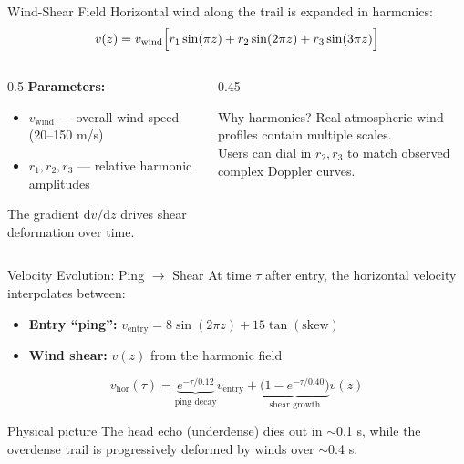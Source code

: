 \documentclass[aspectratio=169,11pt]{beamer}
\begin{document}
\begin{frame}{Wind-Shear Field}
Horizontal wind along the trail is expanded in harmonics:
\[
v(z) = v_{\mathrm{wind}} \Bigl[ r_1 \sin(\pi z) + r_2 \sin(2\pi z) + r_3 \sin(3\pi z) \Bigr]
\]

\begin{columns}
\begin{column}{0.5\textwidth}
\textbf{Parameters:}
\begin{itemize}
    \item $v_{\mathrm{wind}}$ --- overall wind speed (20--150 m/s)
    \item $r_1, r_2, r_3$ --- relative harmonic amplitudes
\end{itemize}
\vspace{0.3em}
The gradient $\mathrm{d}v/\mathrm{d}z$ drives shear deformation over time.
\end{column}
\begin{column}{0.45\textwidth}
\begin{block}{Why harmonics?}
Real atmospheric wind profiles contain multiple scales. \\
Users can dial in $r_2, r_3$ to match observed complex Doppler curves.
\end{block}
\end{column}
\end{columns}
\end{frame}

\begin{frame}{Velocity Evolution: Ping $\to$ Shear}
At time $\tau$ after entry, the horizontal velocity interpolates between:
\begin{itemize}
    \item \textbf{Entry ``ping'':} $v_{\mathrm{entry}} = 8\sin(2\pi z) + 15\tan(\mathrm{skew})$
    \item \textbf{Wind shear:} $v(z)$ from the harmonic field
\end{itemize}

\[
v_{\mathrm{hor}}(\tau) = \underbrace{e^{-\tau/0.12}}_{\text{ping decay}} v_{\mathrm{entry}} +
                         \underbrace{\bigl(1 - e^{-\tau/0.40}\bigr)}_{\text{shear growth}} v(z)
\]

\begin{alertblock}{Physical picture}
The head echo (underdense) dies out in $\sim$0.1 s, while the overdense trail is progressively deformed by winds over $\sim$0.4 s.
\end{alertblock}
\end{frame}
\end{document}
